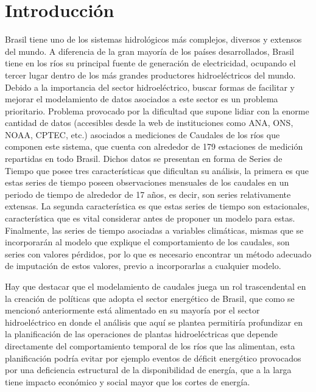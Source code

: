 \documentclass[12pt,oneside]{book}\usepackage[]{graphicx}\usepackage[]{color}
\theoremstyle{definition} %
\begin{document}
\mainmatter
\addtolength{\abovedisplayskip}{-1mm}
\addtolength{\belowdisplayskip}{-1mm}






\chapter{Introducción}\label{cap1}


Brasil tiene uno de los sistemas hidrológicos más complejos, diversos y extensos del mundo. A diferencia de la gran mayoría de los países desarrollados, Brasil tiene en los ríos su principal fuente de generación de electricidad, ocupando el tercer lugar dentro de los más grandes productores hidroeléctricos del mundo. Debido a la importancia del sector hidroeléctrico, buscar formas de facilitar y mejorar el modelamiento de datos asociados a este sector es un problema prioritario. Problema provocado por la dificultad que supone lidiar con la enorme cantidad de datos (accesibles desde la web de instituciones como ANA, ONS, NOAA, CPTEC, etc.) asociados a mediciones de Caudales de los ríos que componen este sistema, que cuenta con alrededor de 179 estaciones de medición repartidas en todo Brasil. Dichos datos se presentan en forma de Series de Tiempo que posee tres características que dificultan su análisis, la primera es que estas series de tiempo poseen observaciones mensuales de los caudales en un periodo de tiempo de alrededor de 17 años, es decir, son series relativamente extensas. La segunda característica es que estas series de tiempo son estacionales, característica que es vital considerar antes de proponer un modelo para estas. Finalmente, las series de tiempo asociadas a variables climáticas, mismas que se incorporarán al modelo que explique el comportamiento de los caudales, son series con valores pérdidos, por lo que es necesario encontrar un método adecuado de imputación de estos valores, previo a incorporarlas a cualquier modelo.



Hay que destacar que el modelamiento de caudales juega un rol trascendental en la creación de políticas que adopta el sector energético de Brasil, que como se mencionó anteriormente está alimentado en su mayoría por el sector hidroeléctrico en donde el análisis que aquí se plantea permitiría profundizar en la planificación de las operaciones de plantas hidroeléctricas que depende directamente del comportamiento temporal de los ríos que las alimentan, esta planificación podría evitar por ejemplo eventos de déficit energético provocados por una deficiencia estructural de la disponibilidad de energía, que a la larga tiene impacto económico y social mayor que los cortes de energía.
\end{document}
